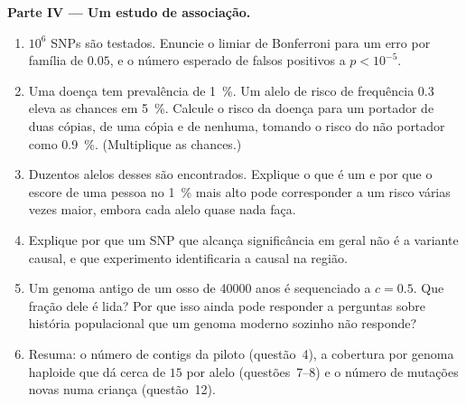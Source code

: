 \begin{problem}
\medskip
\noindent\textbf{Parte IV --- Um estudo de associação.}
\begin{enumerate}[resume]
  \item $10^{6}$ SNPs são testados. Enuncie o limiar de Bonferroni para
        um erro por família de $0.05$, e o número esperado de falsos
        positivos a $p < 10^{-5}$.
  \item Uma doença tem prevalência de \qty{1}{\%}. Um alelo de risco de
        frequência $0.3$ eleva as chances em \qty{5}{\%}. Calcule o
        risco da doença para um portador de duas cópias, de uma cópia e
        de nenhuma, tomando o risco do não portador como \qty{0.9}{\%}.
        (Multiplique as chances.)
  \item Duzentos alelos desses são encontrados. Explique o que é um
         e por que o escore de uma pessoa no
        \qty{1}{\%} mais alto pode corresponder a um risco várias vezes
        maior, embora cada alelo quase nada faça.
  \item Explique por que um SNP que alcança significância em geral não
        é a variante causal, e que experimento identificaria a causal
        na região.
  \item Um genoma antigo de um osso de \num{40000} anos é sequenciado a
        $c = 0.5$. Que fração dele é lida? Por que isso ainda pode
        responder a perguntas sobre história populacional que um genoma
        moderno sozinho não responde?
  \item Resuma: o número de contigs da  piloto (questão~4), a
        cobertura por genoma haploide que dá cerca de $15$  por
        alelo (questões~7--8) e o número de mutações novas numa criança
        (questão~12).
\end{enumerate}
\end{problem}
